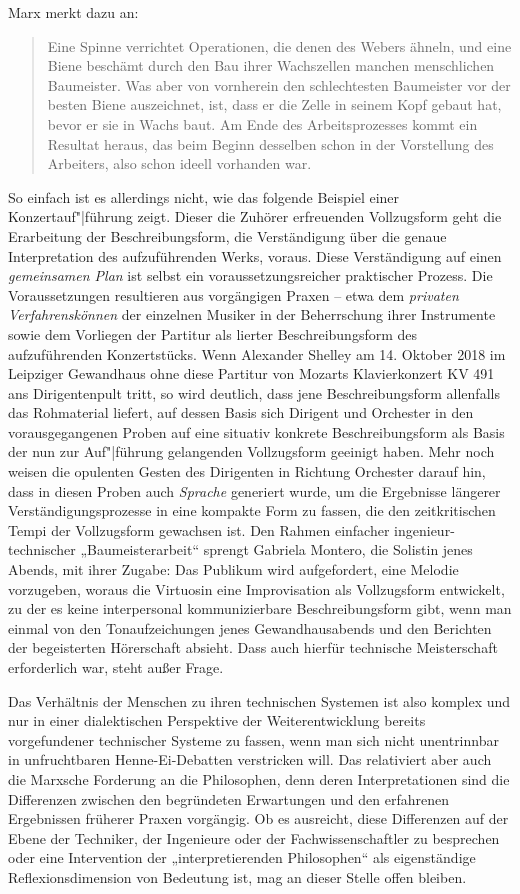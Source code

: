 \documentclass[11pt,a4paper]{article}
\begin{document}
Marx \cite[S. 193]{MEW23} merkt dazu an:
\begin{quote}
  Eine Spinne verrichtet Operationen, die denen des Webers ähneln, und eine
  Biene beschämt durch den Bau ihrer Wachszellen manchen menschlichen
  Baumeister. Was aber von vornherein den schlechtesten Baumeister vor der
  besten Biene auszeichnet, ist, dass er die Zelle in seinem Kopf gebaut hat,
  bevor er sie in Wachs baut. Am Ende des Arbeitsprozesses kommt ein Resultat
  heraus, das beim Beginn desselben schon in der Vorstellung des Arbeiters,
  also schon ideell vorhanden war.
\end{quote}
So einfach ist es allerdings nicht, wie das folgende Beispiel einer
Konzertauf"|führung zeigt. Dieser die Zuhörer erfreuenden Vollzugsform geht
die Erarbeitung der Beschreibungsform, die Verständigung über die genaue
Interpretation des aufzuführenden Werks, voraus. Diese Verständigung auf einen
\emph{gemeinsamen Plan} ist selbst ein voraussetzungsreicher praktischer
Prozess.  Die Voraussetzungen resultieren aus vorgängigen Praxen -- etwa dem
\emph{privaten Verfahrenskönnen} der einzelnen Musiker in der Beherrschung
ihrer Instrumente sowie dem Vorliegen der Partitur als lierter
Beschreibungsform des aufzuführenden Konzertstücks.  Wenn Alexander Shelley am
14. Oktober 2018 im Leipziger Gewandhaus ohne diese Partitur von Mozarts
Klavierkonzert KV 491 ans Dirigentenpult tritt, so wird deutlich, dass jene
Beschreibungsform allenfalls das Rohmaterial liefert, auf dessen Basis sich
Dirigent und Orchester in den vorausgegangenen Proben auf eine situativ
konkrete Beschreibungsform als Basis der nun zur Auf"|führung gelangenden
Vollzugsform geeinigt haben. Mehr noch weisen die opulenten Gesten des
Dirigenten in Richtung Orchester darauf hin, dass in diesen Proben auch
\emph{Sprache} generiert wurde, um die Ergebnisse längerer
Verständigungsprozesse in eine kompakte Form zu fassen, die den zeitkritischen
Tempi der Vollzugsform gewachsen ist.  Den Rahmen einfacher
ingenieur-technischer „Baumeisterarbeit“ sprengt Gabriela Montero, die
Solistin jenes Abends, mit ihrer Zugabe: Das Publikum wird aufgefordert, eine
Melodie vorzugeben, woraus die Virtuosin eine Improvisation als Vollzugsform
entwickelt, zu der es keine interpersonal kommunizierbare Beschreibungsform
gibt, wenn man einmal von den Tonaufzeichungen jenes Gewandhausabends und den
Berichten der begeisterten Hörerschaft absieht.  Dass auch hierfür technische
Meisterschaft erforderlich war, steht außer Frage.

Das Verhältnis der Menschen zu ihren technischen Systemen ist also komplex und
nur in einer dialektischen Perspektive der Weiterentwicklung bereits
vorgefundener technischer Systeme zu fassen, wenn man sich nicht unentrinnbar
in unfruchtbaren Henne-Ei-Debatten verstricken will.  Das relativiert aber
auch die Marxsche Forderung an die Philosophen, denn deren Interpretationen
sind die Differenzen zwischen den begründeten Erwartungen und den erfahrenen
Ergebnissen früherer Praxen vorgängig. Ob es ausreicht, diese Differenzen auf
der Ebene der Techniker, der Ingenieure oder der Fachwissenschaftler zu
besprechen oder eine Intervention der „interpretierenden Philosophen“ als
eigenständige Reflexionsdimension von Bedeutung ist, mag an dieser Stelle
offen bleiben.
\end{document}
